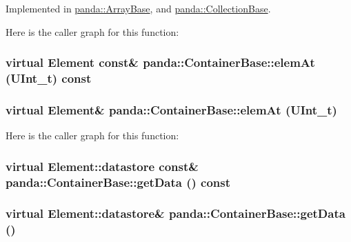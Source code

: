 Implemented in \hyperlink{classpanda_1_1ArrayBase_a7c39d39cffed07ba2cffdf8828729cf7}{panda::ArrayBase}, and \hyperlink{classpanda_1_1CollectionBase_ac615b3ca8e0c3acdab38196bcad23027}{panda::CollectionBase}.

Here is the caller graph for this function:\hypertarget{classpanda_1_1ContainerBase_af7ad04980a8ea457f100af2fef7a5dff}{
\subsubsection[{elemAt}]{\setlength{\rightskip}{0pt plus 5cm}virtual {\bf Element} const\& panda::ContainerBase::elemAt (UInt\_\-t) const}}
\label{classpanda_1_1ContainerBase_af7ad04980a8ea457f100af2fef7a5dff}
\hypertarget{classpanda_1_1ContainerBase_a486ab175342124d641c3ec47dea84a5e}{
\subsubsection[{elemAt}]{\setlength{\rightskip}{0pt plus 5cm}virtual {\bf Element}\& panda::ContainerBase::elemAt (UInt\_\-t)}}
\label{classpanda_1_1ContainerBase_a486ab175342124d641c3ec47dea84a5e}


Here is the caller graph for this function:\hypertarget{classpanda_1_1ContainerBase_aaf39afa04dcee863becce6b68068f809}{
\subsubsection[{getData}]{\setlength{\rightskip}{0pt plus 5cm}virtual {\bf Element::datastore} const\& panda::ContainerBase::getData () const}}
\label{classpanda_1_1ContainerBase_aaf39afa04dcee863becce6b68068f809}
\hypertarget{classpanda_1_1ContainerBase_adbb8e159edc835222dc6485291d3830d}{
\subsubsection[{getData}]{\setlength{\rightskip}{0pt plus 5cm}virtual {\bf Element::datastore}\& panda::ContainerBase::getData ()}}
\label{classpanda_1_1ContainerBase_adbb8e159edc835222dc6485291d3830d}


